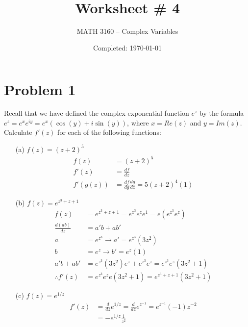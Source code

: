 \documentclass{article}
\title{Worksheet \# 4}
\author{
  MATH 3160 -- Complex Variables\\
  \myauthor
}
\date{Completed: \today}
\newcommand{\der}[2]{\frac{d#1}{d#2}}
\begin{document}
\maketitle %


\section*{Problem 1}
Recall that we have defined the complex exponential function $e^z$ by the formula $e^z = e^xe^{iy} = e^x(\cos{(y)} + i \sin{(y)})$, where $x = Re(z)$ and $y = Im(z)$.
\\

Calculate $f'(z)$ for each of the following functions:

\begin{enumerate}
\item[(a)] $f (z) = (z + 2)^5$
  \begin{align*}
    f (z) &= (z + 2)^5\\
    f'(z) &= \der{f}{z} \\
    f'(g(z)) &= \der{f}{g}\der{g}{z} =  5(z+2)^4(1) 
  \end{align*}
\item[(b)] $f (z) = e^{z^3+z+1}$
  \begin{align*}
    f(z) &= e^{z^3+z+1} = e^{z^3}e^{z}e^{1} = e(e^{z^3}e^{z})\\
    \der{(ab)}{z} &= a'b+ab' \\
    a &= e^{z^3} \to a' = e^{z^3}(3z^2) \\
    b &= e^{z} \to b' = e^z(1)\\
    a'b+ab' &= e^{z^3}(3z^2)e^z+e^{z^3}e^z = e^{z^3}e^z(3z^2 + 1)\\
    \therefore f'(z) &= e^{z^3}e^ze(3z^2 + 1) = e^{z^3+z+1}(3z^2 + 1) 
  \end{align*}
\item[(c)] $f (z) = e^{1/z}$
  \begin{align*}
    f'(z) &= \der{}{z}e^{1/z} = \der{}{z}e^{z^{-1}} = e^{z^{-1}}(-1)z^{-2}\\
    &= -e^{1/z}\frac{1}{z^2}
  \end{align*}
\end{enumerate}
\end{document}
